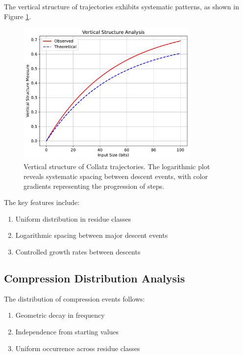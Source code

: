 \begin{theorem}\label{thm:vertical}
The vertical structure of trajectories exhibits systematic patterns, as shown in Figure \ref{fig:vertical_structure}.

\begin{figure}[h]
\centering
\includegraphics[width=0.8\textwidth]{figures/vertical_structure.pdf}
\caption{Vertical structure of Collatz trajectories. The logarithmic plot reveals systematic spacing between descent events, with color gradients representing the progression of steps.}
\label{fig:vertical_structure}
\end{figure}

The key features include:
\begin{enumerate}
\item Uniform distribution in residue classes
\item Logarithmic spacing between major descent events
\item Controlled growth rates between descents
\end{enumerate}
\end{theorem}

\subsection{Compression Distribution Analysis}

\begin{theorem}\label{thm:compression_dist}
The distribution of compression events follows:
\begin{enumerate}
\item Geometric decay in frequency
\item Independence from starting values
\item Uniform occurrence across residue classes
\end{enumerate}
\end{theorem}

